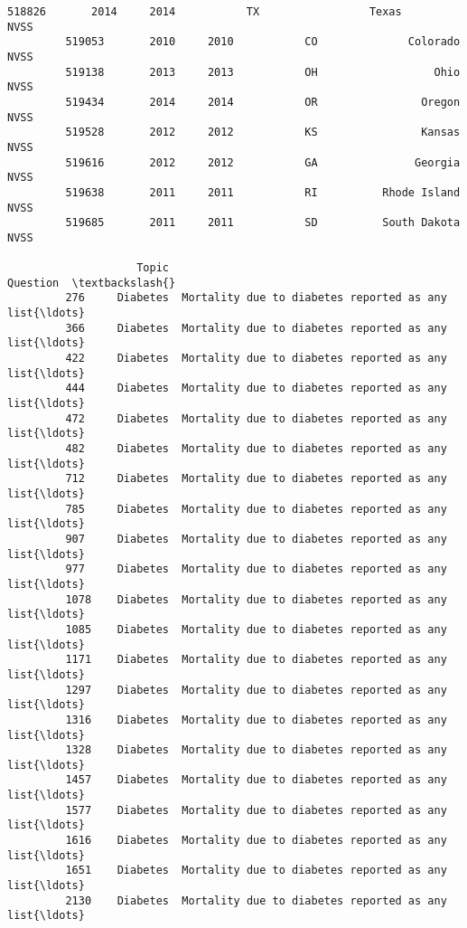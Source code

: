 \documentclass[11pt]{article}
\begin{document}
\begin{Verbatim}[commandchars=\\\{\}]
         518826       2014     2014           TX                 Texas       NVSS   
         519053       2010     2010           CO              Colorado       NVSS   
         519138       2013     2013           OH                  Ohio       NVSS   
         519434       2014     2014           OR                Oregon       NVSS   
         519528       2012     2012           KS                Kansas       NVSS   
         519616       2012     2012           GA               Georgia       NVSS   
         519638       2011     2011           RI          Rhode Island       NVSS   
         519685       2011     2011           SD          South Dakota       NVSS   
         
                    Topic                                           Question  \textbackslash{}
         276     Diabetes  Mortality due to diabetes reported as any list{\ldots}   
         366     Diabetes  Mortality due to diabetes reported as any list{\ldots}   
         422     Diabetes  Mortality due to diabetes reported as any list{\ldots}   
         444     Diabetes  Mortality due to diabetes reported as any list{\ldots}   
         472     Diabetes  Mortality due to diabetes reported as any list{\ldots}   
         482     Diabetes  Mortality due to diabetes reported as any list{\ldots}   
         712     Diabetes  Mortality due to diabetes reported as any list{\ldots}   
         785     Diabetes  Mortality due to diabetes reported as any list{\ldots}   
         907     Diabetes  Mortality due to diabetes reported as any list{\ldots}   
         977     Diabetes  Mortality due to diabetes reported as any list{\ldots}   
         1078    Diabetes  Mortality due to diabetes reported as any list{\ldots}   
         1085    Diabetes  Mortality due to diabetes reported as any list{\ldots}   
         1171    Diabetes  Mortality due to diabetes reported as any list{\ldots}   
         1297    Diabetes  Mortality due to diabetes reported as any list{\ldots}   
         1316    Diabetes  Mortality due to diabetes reported as any list{\ldots}   
         1328    Diabetes  Mortality due to diabetes reported as any list{\ldots}   
         1457    Diabetes  Mortality due to diabetes reported as any list{\ldots}   
         1577    Diabetes  Mortality due to diabetes reported as any list{\ldots}   
         1616    Diabetes  Mortality due to diabetes reported as any list{\ldots}   
         1651    Diabetes  Mortality due to diabetes reported as any list{\ldots}   
         2130    Diabetes  Mortality due to diabetes reported as any list{\ldots}   

\end{Verbatim}
\end{document}
